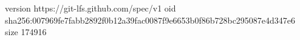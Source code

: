 version https://git-lfs.github.com/spec/v1
oid sha256:007969fe7fabb2892f0b12a39fac0087f9e6653b0f86b728bc295087e4d347e6
size 174916
